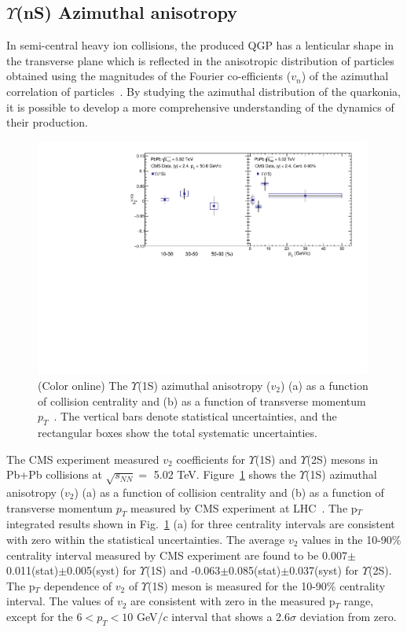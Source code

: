     
\subsection{$\Upsilon$(nS) Azimuthal anisotropy}


In semi-central heavy ion collisions,
the produced QGP has a lenticular shape in the transverse plane
which is reflected in the anisotropic
distribution of particles obtained using the magnitudes
of the Fourier co-efficients ($v_{n}$) of the azimuthal correlation of
particles~\cite{Voloshin:1994mz}. By studying the azimuthal distribution of
the quarkonia, it is possible to develop a more comprehensive understanding
of the dynamics of their production.

\begin{figure}
\includegraphics[width=0.99\textwidth]{Figures/Fig10_CMS_Y1S_5TeV_V2.pdf}
\caption{(Color online) The $\Upsilon$(1S) azimuthal anisotropy ($v_{2}$) (a) as a
  function of collision centrality and (b) as a function of transverse momentum
  $p_{T}$~\cite{CMS:2020efs}. The vertical bars denote statistical uncertainties,
  and the rectangular boxes show the total systematic uncertainties.
}
\label{fig:Upsilon1SV2CMS}
\end{figure}



The CMS experiment measured $v_{2}$ coefficients for $\Upsilon$(1S) and $\Upsilon$(2S)
mesons in Pb+Pb collisions at $\sqrt{s_{NN}}=$ 5.02 TeV.
Figure~\ref{fig:Upsilon1SV2CMS} shows the $\Upsilon$(1S) azimuthal
anisotropy ($v_{2}$) (a) as a function of collision centrality and (b) as a
function of transverse momentum $p_{T}$ measured by CMS experiment at
LHC~\cite{CMS:2020efs}. The p$_{T}$ integrated results shown in
Fig.~\ref{fig:Upsilon1SV2CMS} (a) for three centrality intervals are consistent
with zero within the statistical uncertainties. The average $v_{2}$ values in the
10-90$\%$ centrality interval measured by CMS experiment are found to
be 0.007$\pm$0.011(stat)$\pm$0.005(syst) for $\Upsilon$(1S) and
-0.063$\pm$0.085(stat)$\pm$0.037(syst) for $\Upsilon$(2S).   
The p$_{T}$ dependence of  $v_{2}$ of $\Upsilon$(1S) meson is measured
for the 10-90$\%$ centrality interval. The values of $v_{2}$ are consistent with
zero in the measured p$_T$ range, except for the $6<p_T<10$ GeV/$c$ interval that
shows a 2.6$\sigma$ deviation from zero. 

